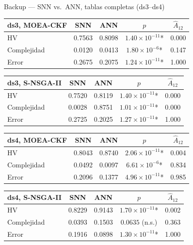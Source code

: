 \documentclass[aspectratio=169,10pt]{beamer}
\newcommand{\Atwelve}{\ensuremath{\hat{A}_{12}}}
\begin{document}
{\begin{frame}{Backup --- SNN vs.\ ANN, tablas completas (ds3--ds4)}
  \centering\tiny
  \begin{tabular}{lcccc}
    \toprule
    \textbf{ds3, MOEA-CKF} & SNN & ANN & $p$ & \Atwelve \\ \midrule
    HV & 0.7563 & 0.8098 & $1.40\times10^{-11}$* & 0.000 \\
    Complejidad & 0.0120 & 0.0413 & $1.80\times10^{-6}$* & 0.147 \\
    Error & 0.2675 & 0.2075 & $1.24\times10^{-11}$* & 1.000 \\ \bottomrule
  \end{tabular}
  \hspace{0.4cm}
  \begin{tabular}{lcccc}
    \toprule
    \textbf{ds3, S-NSGA-II} & SNN & ANN & $p$ & \Atwelve \\ \midrule
    HV & 0.7520 & 0.8119 & $1.40\times10^{-11}$* & 0.000 \\
    Complejidad & 0.0028 & 0.8751 & $1.01\times10^{-11}$* & 0.000 \\
    Error & 0.2725 & 0.2025 & $1.27\times10^{-11}$* & 1.000 \\ \bottomrule
  \end{tabular}

  \vspace{6pt}
  \begin{tabular}{lcccc}
    \toprule
    \textbf{ds4, MOEA-CKF} & SNN & ANN & $p$ & \Atwelve \\ \midrule
    HV & 0.8043 & 0.8740 & $2.06\times10^{-11}$* & 0.004 \\
    Complejidad & 0.0492 & 0.0097 & $6.61\times10^{-6}$* & 0.834 \\
    Error & 0.2096 & 0.1377 & $4.96\times10^{-11}$* & 0.985 \\ \bottomrule
  \end{tabular}
  \hspace{0.4cm}
  \begin{tabular}{lcccc}
    \toprule
    \textbf{ds4, S-NSGA-II} & SNN & ANN & $p$ & \Atwelve \\ \midrule
    HV & 0.8229 & 0.9143 & $1.70\times10^{-11}$* & 0.002 \\
    Complejidad & 0.0393 & 0.1503 & $0.0635$ (n.s.) & 0.363 \\
    Error & 0.1916 & 0.0898 & $1.30\times10^{-11}$* & 1.000 \\ \bottomrule
  \end{tabular}
\end{frame}

}
\end{document}
